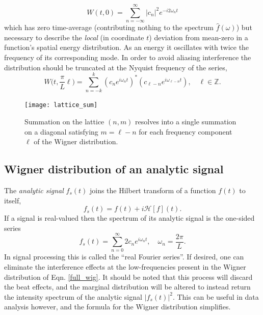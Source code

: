 \documentclass{article}
\begin{document}
\begin{appendices}
\begin{equation}
  W(t, 0) = \sum_{n=-\infty}^\infty|c_n|^2e^{-i2\omega_nt}
\end{equation}
which has zero time-average (contributing nothing to the spectrum $\hat{f}(\omega)$) but necessary to describe the \textit{local} (in coordinate $t$) deviation from mean-zero in a function's spatial energy distribution. As an energy it oscillates with twice the frequency of its corresponding mode. In order to avoid aliasing interference the distribution should be truncated at the Nyquist frequency of the series,
\begin{equation}
  W\Big(t, \frac{\pi}{L}\ell\Big) = \sum_{n=-k}^k(c_ne^{i\omega_nt})^*(c_{\ell-n}e^{i\omega_{\ell - n}t}),\quad \ell\in\mathbb{Z}.\label{full_wig}
\end{equation}

\begin{figure}[b!]
  \centering
  \texttt{[image: lattice\_sum]}
  \caption{Summation on the lattice $(n,m)$ resolves into a single summation on a diagonal satisfying $m=\ell-n$ for each frequency component $\ell$ of the Wigner distribution.}\label{lattice}
\end{figure}

\subsection{Wigner distribution of an analytic signal}\label{analytic}
The \textit{analytic signal} $f_s(t)$ joins the Hilbert transform of a function $f(t)$ to itself,
\begin{equation}
  f_s(t) = f(t) + i\mathcal{H}[f](t).
\end{equation}
If a signal is real-valued then the spectrum of its analytic signal is the one-sided series
\begin{equation}
  f_s(t) = \sum_{n=0}^\infty 2c_ne^{i\omega_nt},\quad \omega_n = \frac{2\pi}{L}.
\end{equation}
In signal processing this is called the ``real Fourier series''. If desired, one can eliminate the interference effects at the low-frequencies present in the Wigner distribution of Eqn. \ref{full_wig}. It should be noted that this process will discard the beat effects, and the marginal distribution will be altered to instead return the intensity spectrum of the analytic signal $|f_s(t)|^2$. This can be useful in data analysis however, and the formula for the Wigner distribution simplifies.


\end{appendices}
\end{document}
